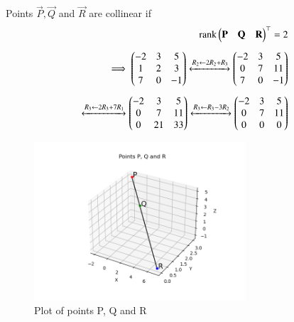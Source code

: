 \documentclass[journal]{IEEEtran}
\begin{document}
Points $\vec{P},\vec{Q}$ and $\vec{R}$ are collinear if 
\begin{align}
	\text{rank}\begin{pmatrix}\mathbf{P} & \mathbf{Q} & \mathbf{R}\end{pmatrix}^\top = 2\\[5pt]
	\implies \begin{pmatrix}-2 & 3 & 5\\1 & 2 & 3\\7 & 0 & -1\end{pmatrix}\xleftrightarrow[]{R_2 \leftarrow 2R_2 + R_3} \begin{pmatrix}-2 & 3 & 5\\0 & 7 & 11\\7 & 0 & -1\end{pmatrix}\\[5pt]
	\xleftrightarrow[]{R_3 \leftarrow 2R_3 + 7R_1} \begin{pmatrix}-2 & 3 & 5\\0 &7 & 11\\0 & 21 & 33\end{pmatrix} \xleftrightarrow[]{R_3 \leftarrow R_3 - 3R_2} \begin{pmatrix}-2 & 3 & 5\\0 & 7 & 11\\0 & 0 & 0\end{pmatrix}
\end{align}
\newpage
	\begin{figure}[h!]    
	  \begin{center}
		\includegraphics[width=0.7\textwidth]{fig/fig.png}
		  \caption{Plot of points P, Q and R}  
	 \end{center}	  
	\end{figure}
\end{document}
